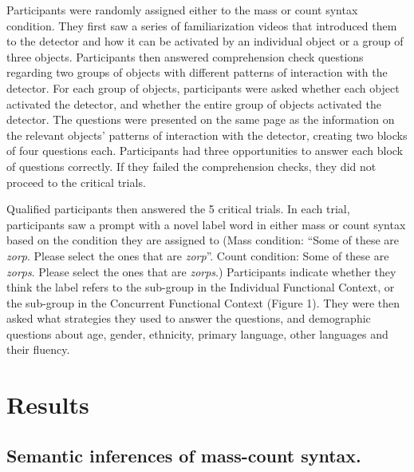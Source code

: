 \documentclass[
  man,floatsintext]{apa6}
\begin{document}
Participants were randomly assigned either to the mass or count syntax condition. They first saw a series of familiarization videos that introduced them to the detector and how it can be activated by an individual object or a group of three objects. Participants then answered comprehension check questions regarding two groups of objects with different patterns of interaction with the detector. For each group of objects, participants were asked whether each object activated the detector, and whether the entire group of objects activated the detector. The questions were presented on the same page as the information on the relevant objects' patterns of interaction with the detector, creating two blocks of four questions each. Participants had three opportunities to answer each block of questions correctly. If they failed the comprehension checks, they did not proceed to the critical trials.

Qualified participants then answered the 5 critical trials. In each trial, participants saw a prompt with a novel label word in either mass or count syntax based on the condition they are assigned to (Mass condition: ``Some of these are \emph{zorp}. Please select the ones that are \emph{zorp}''. Count condition: Some of these are \emph{zorps}. Please select the ones that are \emph{zorps}.) Participants indicate whether they think the label refers to the sub-group in the Individual Functional Context, or the sub-group in the Concurrent Functional Context (Figure 1). They were then asked what strategies they used to answer the questions, and demographic questions about age, gender, ethnicity, primary language, other languages and their fluency.

\hypertarget{results}{%
\section{Results}\label{results}}

\hypertarget{semantic-inferences-of-mass-count-syntax.}{%
\subsection{Semantic inferences of mass-count syntax.}\label{semantic-inferences-of-mass-count-syntax.}}
\end{document}
